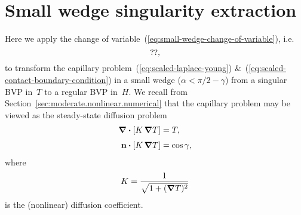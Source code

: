 \chapter{Small wedge singularity extraction}
\label{ch:extraction}

Here we apply the change of variable~(\ref{eq:small-wedge-change-of-variable}),
i.e.
\begin{equation}
  \usecontent{eq:small-wedge-change-of-variable},
  \label{eq:small-wedge-change-of-variable-appendix}
\end{equation}
to transform the capillary problem~(\ref{eq:scaled-laplace-young})
\&~(\ref{eq:scaled-contact-boundary-condition})
in a small wedge ($\alpha < \pi/2 - \gamma$)
from a singular BVP in~$T$
to a regular BVP in~$H$.
We recall from Section~\ref{sec:moderate.nonlinear.numerical}
that the capillary problem may be viewed
as the steady-state diffusion problem
\begin{align}
  \del \dotp \squarebr{K \del T} &= T,
    \label{eq:laplace-young-diffusion-appendix}
    \\[\tallspace]
  \normalvec \dotp \squarebr{K \del T} &= \cos\gamma,
  \label{eq:contact-boundary-condition-diffusion-appendix}
\end{align}
where
\begin{equation}
  K = \frac{1}{\sqrt{1 + (\mathop{}\!\boldsymbol{\mathbf{\nabla}} T)^2}}
  \label{eq:laplace-young-diffusion-coefficient-appendix}
\end{equation}
is the (nonlinear) diffusion coefficient.

